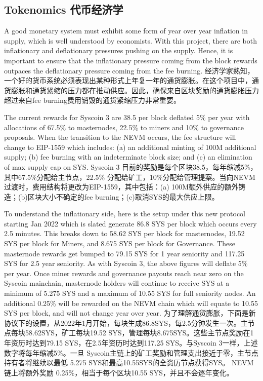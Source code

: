 \documentclass{ctexart}
\begin{document}
\subsection{Tokenomics 代币经济学}

A good monetary system must exhibit some form of year over year inflation in supply, which is well understood by economists. With this project, there are both inflationary and deflationary pressures pushing on the supply. Hence, it is important to ensure that the inflationary pressure coming from the block rewards outpaces the deflationary pressure coming from the fee burning. 经济学家熟知，一个好的货币系统必须表现出某种形式上年复一年的通货膨胀。在这个项目中，通货膨胀和通货紧缩的压力都在推动供应。因此，确保来自区块奖励的通货膨胀压力超过来自fee burning费用销毁的通货紧缩压力非常重要。

The current rewards for Syscoin 3 are 38.5 per block deflated 5\% per year with allocations of 67.5\% to masternodes, 22.5\% to miners and 10\% to governance proposals. When the transition to the NEVM occurs, the fee structure will change to EIP-1559 which includes: (a) an additional minting of 100M additional supply; (b) fee burning with an indeterminate block size; and (c) an elimination of max supply cap on SYS. Syscoin 3 目前的奖励是每个区块38.5，每年缩减5\%，其中67.5\%分配给主节点，22.5\% 分配给矿工，10\%分配给管理提案。当向NEVM过渡时，费用结构将更改为EIP-1559，其中包括：(a) 100M额外供应的额外铸造；(b)区块大小不确定的fee burning；(c)取消SYS的最大供应上限。

To understand the inflationary side, here is the setup under this new protocol starting Jan 2022 which is slated generate 86.8 SYS per block which occurs every 2.5 minutes. This breaks down to 58.62 SYS per block for masternodes, 19.52 SYS per block for Miners, and 8.675 SYS per block for Governance. These masternode rewards get bumped to 79.15 SYS for 1 year seniority and 117.25 SYS for 2.5 year seniority. As with Syscoin 3, the above figures will deflate 5\% per year. Once miner rewards and governance payouts reach near zero on the Syscoin mainchain, masternode holders will continue to receive SYS at a minimum of 5.275 SYS and a maximum of 10.55 SYS for full seniority nodes. An additional 0.25\% will be rewarded on the NEVM chain which will equate to 10.55 SYS per block, and will not change year over year. 为了理解通货膨胀，下面是新协议下的设置，从2022年1月开始，每块生成86.8SYS，每2.5分钟发生一次。主节点每块58.62SYS，矿工每块19.52 SYS，管理每块8.675SYS。这些主节点奖励在1年资历时达到79.15 SYS，在2.5年资历时达到117.25 SYS。与Syscoin 3一样，上述数字将每年缩减5\%。一旦 Syscoin主链上的矿工奖励和管理支出接近于零，主节点持有者将继续以最低 5.275 SYS和最高10.55SYS的全资历节点获得SYS。 NEVM链上将额外奖励 0.25\%，相当于每个区块10.55 SYS，并且不会逐年变化。
\end{document}
